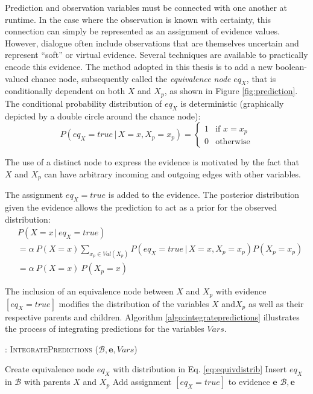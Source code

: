Prediction and observation variables must be connected with one another at runtime.  In the case where the observation is known with certainty, this connection can simply be represented as an assignment of evidence values.  However, dialogue often include observations that are themselves uncertain and represent ``soft'' or virtual evidence.  Several techniques are available to practically encode this evidence. The method adopted in this thesis is to add a new boolean-valued chance node, subsequently called the \textit{equivalence node} $eq_{X}$, that is conditionally dependent on both $X$ and $X_p$, as shown in Figure \ref{fig:prediction}. The conditional probability distribution of $eq_X$ is deterministic (graphically depicted by a double circle around the chance node): 
\begin{equation}
P(eq_{X}\!=\!true \, | \, X\!=\!x, X_p\!=\!x_p) = \begin{cases}
1 & \text{if } x = x_p \\
0 & \text{otherwise}
\end{cases} \label{eq:equivdistrib}
\end{equation}

The use of a distinct node to express the evidence is motivated by the fact that $X$ and $X_p$ can have arbitrary incoming and outgoing edges with other variables. 

The assignment $eq_{X} \!=\! true$ is added to the evidence. The posterior distribution given the evidence allows the prediction to act as a prior for the observed distribution:
\begin{align}
&P(X = x \, | \, eq_{X}\!=\!true) \nonumber \\
&=  \alpha \ P(X\!=\!x)  \sum_{x_p \in \textit{Val}(X_p)} P(eq_{X}\!=\!true\, |\, X\!=\!x, X_p \!=\!x_p ) P(X_p\!=\!x_p) \\
&= \alpha \ P(X\!=\!x) \ P(X_p\!=\!x) \label{eq:equivalence}
\end{align}

The inclusion of an equivalence node between $X$ and $X_p$ with evidence  $[eq_{X}\!=\!true]$ modifies the distribution of the variables $X$ and$X_p$ as well as their respective parents and children. Algorithm \ref{algo:integratepredictions} illustrates the process of integrating predictions for the variables $\mathit{Vars}$. 

\begin{algorithm}[h]
\caption{: \textsc{IntegratePredictions} ($\mathcal{B}, \mathbf{e}, \mathit{Vars}$)}
\begin{algorithmic}[1] \vspace{1mm}
\STATE Create equivalence node $eq_{X}$ with distribution in Eq. \eqref{eq:equivdistrib}
\STATE Insert $eq_{X}$ in $\mathcal{B}$ with parents $\mathit{X}$ and $\mathit{X}_p$
\STATE Add assignment $[eq_{X}\!=\!true]$ to evidence $\mathbf{e}$
\ENDIF
\ENDFOR
\RETURN $\mathcal{B}, \mathbf{e}$
\end{algorithmic}
\label{algo:integratepredictions}
\end{algorithm}




